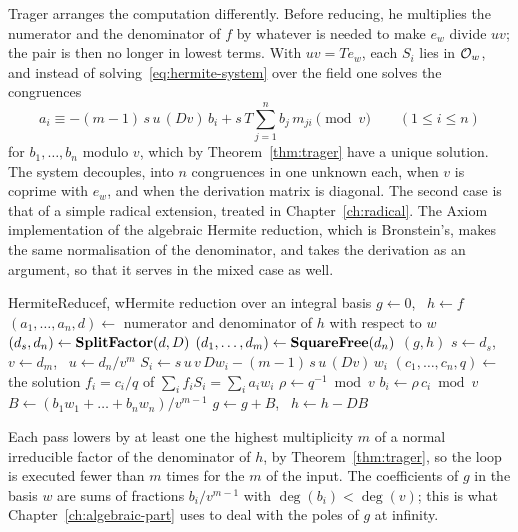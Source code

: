 \begin{remark}\label{rem:trager-form}
Trager arranges the computation differently.
Before reducing, he multiplies the numerator and the denominator of $f$ by
whatever is needed to make $e_w$ divide $u v$; the pair is then no longer in
lowest terms. With $u v = T e_w$, each $S_i$ lies in $\mathcal{O}_w$, and instead of
solving~\eqref{eq:hermite-system} over the field one solves the congruences
\[
  a_i \equiv -(m - 1)\, s\,u\,(Dv)\, b_i + s\,T \sum_{j=1}^n b_j\, m_{ji}
  \pmod{v} \qquad (1 \le i \le n)
\]
for $b_1, \dots, b_n$ modulo $v$, which by Theorem~\ref{thm:trager} have a
unique solution. The system decouples, into $n$ congruences in one unknown
each, when $v$ is coprime with $e_w$, and when the derivation matrix is
diagonal. The second case is that of a simple radical extension, treated in
Chapter~\ref{ch:radical}. The Axiom implementation of the algebraic Hermite
reduction, which is Bronstein's, makes the same normalisation of the
denominator, and takes the derivation as an argument, so that it serves in
the mixed case as well.
\end{remark}

\begin{algo}{HermiteReduce}{f, w}{Hermite reduction over an integral basis}
\State $g \gets 0$, \ $h \gets f$
\Loop
  \State $(a_1, \dots, a_n, d) \gets$ numerator and denominator of $h$ with respect to $w$
  \State $(d_s, d_n) \gets \textbf{SplitFactor}(d, D)$ 
  \State $(d_1, \dots, d_m) \gets \textbf{SquareFree}(d_n)$ 
   \Return $(g, h)$ \EndIf
  \State $s \gets d_s$, \ $v \gets d_m$, \ $u \gets d_n / v^m$
    \State $S_i \gets s\,u\,v\, Dw_i - (m - 1)\, s\,u\,(Dv)\, w_i$
  \EndFor
  \State $(c_1, \dots, c_n, q) \gets$ the solution $f_i = c_i / q$ of $\sum_i f_i S_i = \sum_i a_i w_i$
  \State $\rho \gets q^{-1} \bmod v$ 
    \State $b_i \gets \rho\, c_i \bmod v$
  \EndFor
  \State $B \gets (b_1 w_1 + \dots + b_n w_n) / v^{m-1}$
  \State $g \gets g + B$, \ $h \gets h - DB$
\EndLoop
\end{algo}

Each pass lowers by at least one the highest multiplicity $m$ of a normal
irreducible factor of the denominator of $h$, by Theorem~\ref{thm:trager}, so the loop is
executed fewer than $m$ times for the $m$ of the input. The coefficients of
$g$ in the basis $w$ are sums of fractions $b_i / v^{m-1}$ with $\deg(b_i) <
\deg(v)$; this is what Chapter~\ref{ch:algebraic-part} uses to deal with the
poles of $g$ at infinity.

